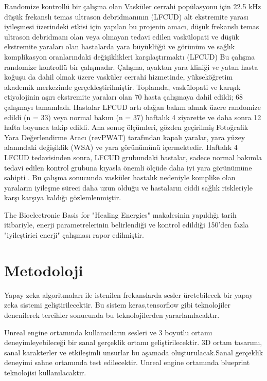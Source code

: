 \documentclass[12pt, a4paper]{article}
\begin{document}
	Randomize kontrollü bir çalışma olan Vasküler cerrahi popülasyonu için 22.5 kHz düşük frekanslı temas ultrason debridmanının (LFCUD) alt ekstremite yarası iyileşmesi üzerindeki etkisi için yapılan bu projenin amacı, düşük frekanslı temas ultrason debridmanı olan veya olmayan tedavi edilen vaskülopati ve düşük ekstremite yaraları olan hastalarda yara büyüklüğü ve görünüm ve sağlık komplikasyon oranlarındaki değişiklikleri karşılaştırmaktı (LFCUD) Bu çalışma randomize kontrollü bir çalışmadır. Çalışma, ayaktan yara kliniği ve yatan hasta koğuşu da dahil olmak üzere vasküler cerrahi hizmetinde, yükseköğretim akademik merkezinde gerçekleştirilmiştir. Toplamda, vaskülopati ve karışık etiyolojinin aşırı ekstremite yaraları olan 70 hasta çalışmaya dahil edildi; 68 çalışmayı tamamladı. Hastalar LFCUD artı olağan bakım almak üzere randomize edildi (n = 33) veya normal bakım (n = 37) haftalık 4 ziyarette ve daha sonra 12 hafta boyunca takip edildi. Ana sonuç ölçümleri, gözden geçirilmiş Fotoğrafik Yara Değerlendirme Aracı (revPWAT) tarafından kapalı yaralar, yara yüzey alanındaki değişiklik (WSA) ve yara görünümünü içermektedir. Haftalık 4 LFCUD tedavisinden sonra, LFCUD grubundaki hastalar, sadece normal bakımla tedavi edilen kontrol grubuna kıyasla önemli ölçüde daha iyi yara görünümüne sahipti .
	Bu çalışma sonucunda vasküler hastalık nedeniyle komplike olan yaraların iyileşme süreci daha uzun olduğu ve hastaların ciddi sağlık riskleriyle karşı karşıya kaldığı gözlemlenmiştir\cite{murphy2018effect}. 
	
	The Bioelectronic Basis for "Healing Energies" makalesinin yapıldığı tarih itibariyle, enerji parametrelerinin belirlendiği ve kontrol edildiği 150'den fazla "iyileştirici enerji" çalışması rapor edilmiştir\cite{roffey2012bioelectronic}.  
	\vspace*{2\baselineskip}
	
	\section{Metodoloji} 	  \vspace*{1\baselineskip}
	Yapay zeka algoritmaları ile istenilen frekanslarda sesler üretebilecek bir yapay zeka sistemi geliştirilecektir. Bu sistem keras,tensorflow gibi teknolojiler denenilerek tercihler sonucunda bu teknolojilerden yararlanılacaktır.
		
   	Unreal engine ortamında kullanıcıların sesleri ve 3 boyutlu ortamı deneyimleyebileceği bir sanal gerçeklik ortamı geliştirilecektir. 3D ortam tasarımı, sanal karakterler ve etkileşimli unsurlar bu aşamada oluşturulacak.Sanal gerçeklik deneyimi sahne ortamında test edilecektir.
	Unreal engine ortamında blueprint teknolojisi kullanılacaktır.
	
\end{document}
